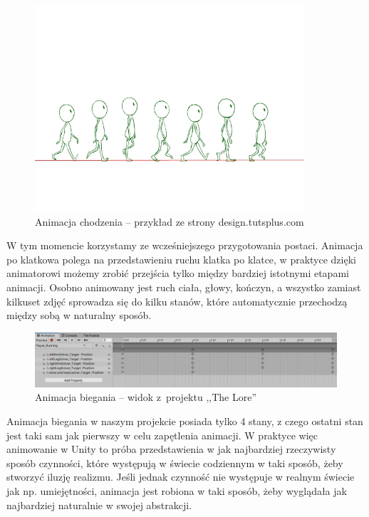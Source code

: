 \documentclass[oneside,polski,logo]{amuthesis}
\begin{document}
\begin{figure}[h]
	\centering
	\includegraphics[width=10cm]{images/kozubal/walkingAnimation.jpg}
	\caption{Animacja chodzenia – przykład ze strony design.tutsplus.com \cite{animation2}}
\end{figure}

\newpage W tym momencie korzystamy ze wcześniejszego przygotowania postaci. Animacja po klatkowa polega na przedstawieniu ruchu klatka po klatce, w praktyce dzięki animatorowi możemy zrobić przejścia tylko między bardziej istotnymi etapami animacji. Osobno animowany jest ruch ciała, głowy, kończyn, a wszystko zamiast kilkuset zdjęć sprowadza się do kilku stanów, które automatycznie przechodzą między sobą w naturalny sposób.

\begin{figure}[h]
	\centering
	\includegraphics[width=13cm]{images/kozubal/runningAnimation.jpg}
	\caption{Animacja biegania – widok z~projektu ,,The Lore''}
\end{figure}

Animacja biegania w naszym projekcie posiada tylko 4 stany, z czego ostatni stan jest taki sam jak pierwszy w celu zapętlenia animacji. W praktyce więc animowanie w Unity to próba przedstawienia w jak najbardziej rzeczywisty sposób czynności, które występują w świecie codziennym w taki sposób, żeby stworzyć iluzję realizmu. Jeśli jednak czynność nie występuje w realnym świecie jak np. umiejętności, animacja jest robiona w taki sposób, żeby wyglądała jak najbardziej naturalnie w swojej abstrakcji.
\end{document}
